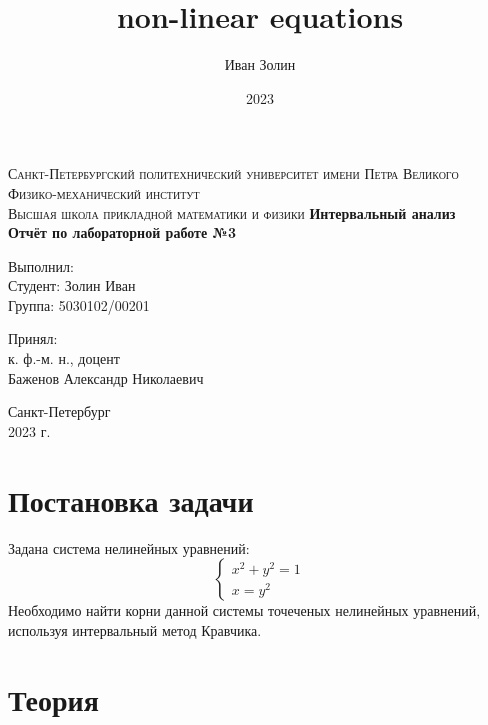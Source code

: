 \documentclass[a4paper,14pt]{article}
\title{non-linear equations}
\author{Иван Золин}
\date{2023}
\begin{document}
	
	\begin{titlepage}
		\begin{center}
			\textsc{
				Санкт-Петербургский политехнический университет имени Петра Великого \\[5mm]
				Физико-механический институт\\[2mm]
				Высшая школа прикладной математики и физики            
			}   
			\vfill
			\textbf{\large
				Интервальный анализ\\
				Отчёт по лабораторной работе №3 \\[3mm]
			}                
		\end{center}
		
		\vfill
		\hfill
		\begin{minipage}{0.5\textwidth}
			Выполнил: \\[2mm]   
			Студент: Золин Иван \\
			Группа: 5030102/00201\\
		\end{minipage}
		
		\hfill
		\begin{minipage}{0.5\textwidth}
			Принял: \\[2mm]
			к. ф.-м. н., доцент \\   
			Баженов Александр Николаевич
		\end{minipage}
		
		\vfill
		\begin{center}
			Санкт-Петербург \\2023 г.
		\end{center}
	\end{titlepage}
	
	\tableofcontents
	\newpage
	
	\section{Постановка задачи}
	Задана система нелинейных уравнений:
	\begin{equation*}
		\begin{cases}
			x^2 + y^2 = 1\\
			x = y^2
		\end{cases}
	\end{equation*}
	Необходимо найти корни данной системы точеченых нелинейных уравнений, используя интервальный метод Кравчика.
	
	\section{Теория}
\end{document}
